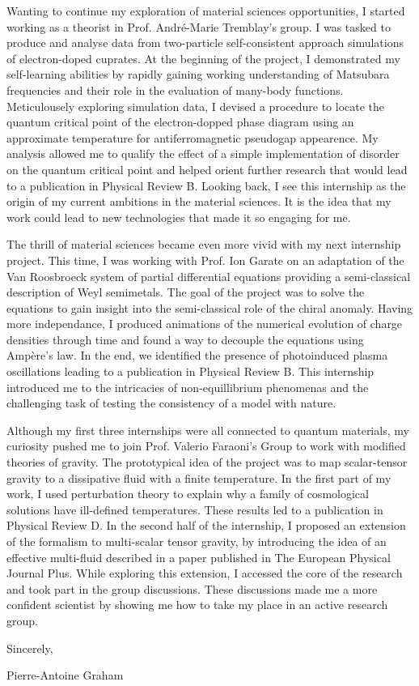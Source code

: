 \documentclass[12pt]{article}
\begin{document}
Wanting to continue my exploration of material sciences opportunities, I started working as a theorist in Prof. André-Marie Tremblay's group. I was tasked to produce and analyse data from two-particle self-consistent approach simulations of electron-doped cuprates. At the beginning of the project, I demonstrated my self-learning abilities by rapidly gaining working understanding of Matsubara frequencies and their role in the evaluation of many-body functions. Meticulousely exploring simulation data, I devised a procedure to locate the quantum critical point of the electron-dopped phase diagram using an approximate temperature for antiferromagnetic pseudogap appearence. My analysis allowed me to qualify the effect of a simple implementation of disorder on the quantum critical point and helped orient further research that would lead to a publication in Physical Review B. Looking back, I see this internship as the origin of my current ambitions in the material sciences. It is the idea that my work could lead to new technologies that made it so engaging for me. \vspace{0.4cm}

The thrill of material sciences became even more vivid with my next internship project. This time, I was working with Prof. Ion Garate on an adaptation of the Van Roosbroeck system of partial differential equations providing a semi-classical description of Weyl semimetals. The goal of the project was to solve the equations to gain insight into the semi-classical role of the chiral anomaly. Having more independance, I produced animations of the numerical evolution of charge densities through time and found a way to decouple the equations using Ampère's law. In the end, we identified the presence of photoinduced plasma oscillations leading to a publication in Physical Review B. This internship introduced me to the intricacies of non-equillibrium phenomenas and the challenging task of testing the consistency of a model with nature. \vspace{0.4cm}  

Although my first three internships were all connected to quantum materials, my curiosity pushed me to join Prof. Valerio Faraoni's Group to work with modified theories of gravity. The prototypical idea of the project was to map scalar-tensor gravity to a dissipative fluid with a finite temperature. In the first part of my work, I used perturbation theory to explain why a family of cosmological solutions have ill-defined temperatures. These results led to a publication in Physical Review D. In the second half of the internship, I proposed an extension of the formalism to multi-scalar tensor gravity, by introducing the idea of an effective multi-fluid described in a paper published in  The European Physical Journal Plus. While exploring this extension, I accessed the core of the research and took part in the group discussions. These discussions made me a more confident scientist by showing me how to take my place in an active research group.\vspace{0.4cm}

Sincerely,

\vspace{0.4cm}
Pierre-Antoine Graham
\end{document}
